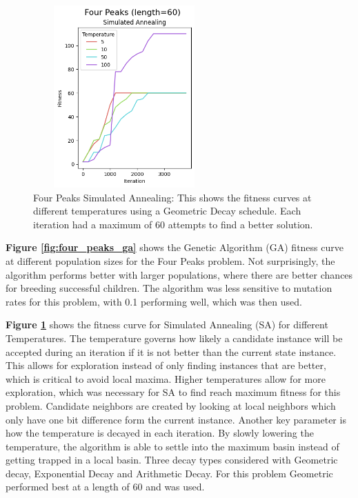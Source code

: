 \documentclass[letterpaper]{article} %
\begin{document}
\begin{figure}[!htb]
\centering
\includegraphics[width=2.75in, height=2.75in]{figures/Four_Peaks_length=60_Simulated_Annealing_l_60_ma_360_d_geom_t_5__10__50__100_.png}
\caption{Four Peaks Simulated Annealing:  This shows the fitness curves at different temperatures using a Geometric Decay schedule. Each iteration had a maximum of 60 attempts to find a better solution. }
\label{fig:four_peaks_sa}
\end{figure}

 \textbf{Figure \ref{fig:four_peaks_ga}} shows the Genetic Algorithm (GA) fitness curve at different population sizes for the Four Peaks problem.  Not surprisingly, the algorithm performs better with larger populations, where there are better chances for breeding successful children.  The algorithm was less sensitive to mutation rates for this problem, with 0.1 performing well, which was then used.



\textbf{Figure \ref{fig:four_peaks_sa}} shows the fitness curve for Simulated Annealing (SA) for different Temperatures.  The temperature governs how likely a candidate instance will be accepted during an iteration if it is not better than the current state instance.  This allows for exploration instead of only finding instances that are better, which is critical to avoid local maxima.    Higher temperatures allow for more exploration, which was necessary for SA to find reach maximum fitness for this problem.  Candidate neighbors are created by looking at local neighbors which only have one bit difference form the current instance.  Another key parameter is how the temperature is decayed in each iteration.  By slowly lowering the temperature, the algorithm is able to settle into the maximum basin instead of getting trapped in a local basin.  Three decay types considered with Geometric decay, Exponential Decay and Arithmetic Decay.  For this problem Geometric performed best at a length of 60 and was used.
\end{document}

